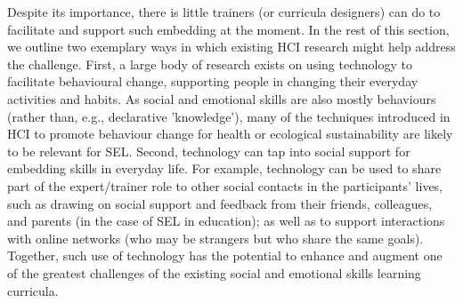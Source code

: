 \documentclass[prodmode,acmtochi]{acmsmall}
\newcommand{\todo}[1]{\textrm{\textrm{\textcolor{LightBlue}{[[#1]]}}}}
\newcommand{\GeraldineTODO}[1]{}
\begin{document}
Despite its importance, there is little trainers (or curricula designers) can do to facilitate and support such embedding at the moment. %
%
In the rest of this section, we outline two exemplary ways in which existing HCI research might help address the challenge. First, a large body of research exists on using technology to facilitate behavioural change, supporting people in changing their everyday activities and habits. As social and emotional skills are also mostly behaviours (rather than, e.g., declarative 'knowledge'), many of the techniques introduced in HCI to promote behaviour change for health or ecological sustainability are likely to be relevant for SEL.\GeraldineTODO{G:  although the specifics of social skills again have the potential to further challenge existing HCI systems into novel directions ... why, how? be a little specific here? } Second,  technology can tap into social support for embedding skills in everyday life. For example, technology can be used to share part of the expert/trainer role to other social contacts in the participants' lives, such as drawing on social support and feedback from their friends, colleagues, and parents (in the case of SEL in education); as well as to support interactions with online networks (who may be strangers but who  share the same goals). 
%
Together, such use of technology has the potential to enhance and augment one of the greatest challenges of the existing social and emotional skills learning curricula. 



\end{document}
